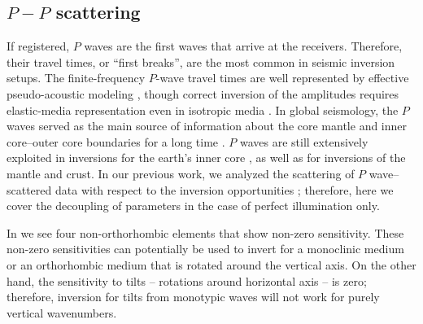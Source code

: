 \subsection{$P-P$ scattering}
%
If registered, $P$ waves are the first waves that arrive at the receivers. Therefore, their travel times, or ``first breaks'', are the most common in seismic inversion setups.  The finite-frequency $P$-wave travel times are well represented by effective pseudo-acoustic 
modeling \citep{alkhalifah2000,wu2017}, though correct inversion of the amplitudes requires elastic-media representation even in isotropic media  
\citep{raknes2014,kurzmann2016}. In global seismology, the $P$ waves served as the main source of information about the core mantle and inner core--outer core boundaries for a long time \citep{bolt1970}. $P$ waves are still extensively exploited in inversions for the earth's inner core \citep{peng2008,yu2016,irving2015}, as well as for inversions of the mantle and crust. 
In our previous work, we analyzed the scattering of $P$ wave--scattered data with respect to the inversion opportunities \citep{kazei2018}; therefore, here we cover the decoupling of parameters in the case of perfect illumination only.

%

In  we see four non-orthorhombic elements that show non-zero 
sensitivity. These non-zero sensitivities can potentially be used to invert for a monoclinic medium or an orthorhombic medium that is rotated around the vertical axis. On the other hand, the sensitivity to tilts -- rotations around horizontal axis -- is zero; therefore, inversion for tilts from monotypic waves will not work for purely 
vertical wavenumbers.

